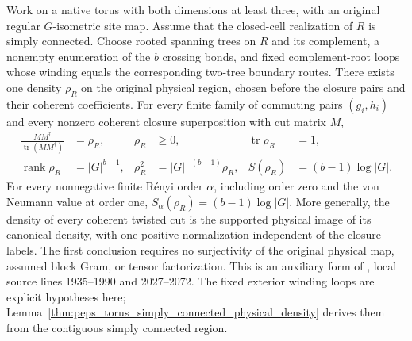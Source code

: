 \begin{lemma}%
    \label{thm:peps_torus_physical_cut_density}
    \leanok
    Work on a native torus with both dimensions at least three, with an
    original regular $G$-isometric site map. Assume that the
    closed-cell realization of $R$ is simply connected. Choose rooted
    spanning trees on $R$ and its complement, a nonempty enumeration
    of the $b$ crossing bonds, and fixed complement-root loops whose
    winding equals the corresponding two-tree boundary routes.
    There exists one density $\rho_R$ on the original physical region,
    chosen before the closure pairs and their coherent coefficients.
    For every finite family of commuting pairs $(g_i,h_i)$ and every
    nonzero coherent closure superposition with cut matrix $M$,
    \begin{align}
        \frac{MM^\dagger}{\operatorname{tr}(MM^\dagger)} & =\rho_R,             &
        \rho_R                                           & \geq0,               & \operatorname{tr}\rho_R & =1, \\
        \operatorname{rank}\rho_R                        & =|G|^{b-1},          &
        \rho_R^2                                         & =|G|^{-(b-1)}\rho_R, &
        S(\rho_R)                                        & =(b-1)\log|G|.
    \end{align}
    For every nonnegative finite Rényi order $\alpha$, including order
    zero and the von Neumann value at order one,
    $S_\alpha(\rho_R)=(b-1)\log|G|$.
    More generally, the density of every coherent twisted cut
    is the supported physical image of its canonical density, with
    one positive normalization independent of the closure labels.
    The first conclusion requires no surjectivity of the original
    physical map, assumed block Gram, or tensor factorization.
    This is an auxiliary form of \cite[Theorem~6.9]{Schuch2010PEPS},
    local source lines 1935--1990 and 2027--2072. The fixed exterior
    winding loops are explicit hypotheses here;
    Lemma~\ref{thm:peps_torus_simply_connected_physical_density}
    derives them from the contiguous simply connected region.
\end{lemma}

